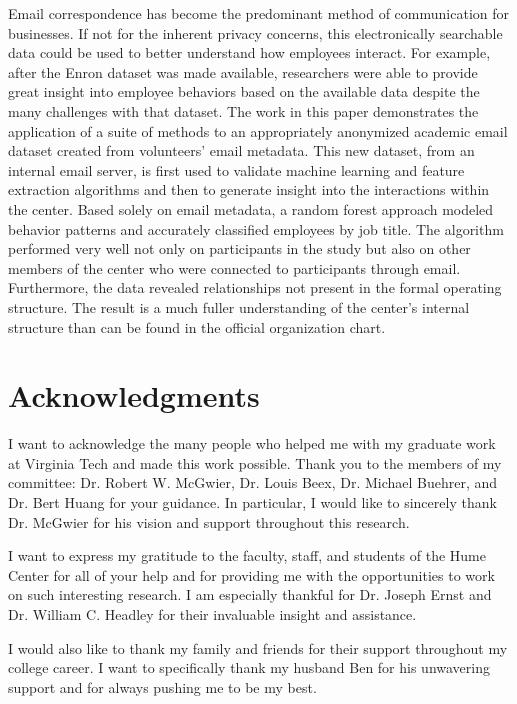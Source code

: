\documentclass[12pt]{report}
\begin{document}
Email correspondence has become the predominant method of communication for businesses.
If not for the inherent privacy concerns, this electronically searchable data could be used to better understand how employees interact. 
For example, after the Enron dataset was made available, researchers were able to provide great insight into employee behaviors based on the available data despite the many challenges with that dataset.  
The work in this paper demonstrates the application of a suite of methods to an appropriately anonymized academic email dataset created from volunteers' email metadata.  
This new dataset, from an internal email server, is first used to validate machine learning and feature extraction algorithms and then to generate insight into the interactions within the center.  
Based solely on email metadata, a random forest approach modeled behavior patterns and accurately classified employees by job title.  
The algorithm performed very well not only on participants in the study but also on other members of the center who were connected to participants through email. 
Furthermore, the data revealed relationships not present in the formal operating structure. 
The result is a much fuller understanding of the center's internal structure than can be found in the official organization chart.


\vfill



\pagebreak

\chapter*{Acknowledgments}
I want to acknowledge the many people who helped me with my graduate work at Virginia Tech and made this work possible.  Thank you to the members of my committee: Dr. Robert W. McGwier, Dr. Louis Beex, Dr. Michael Buehrer, and Dr. Bert Huang for your guidance.  In particular, I would like to sincerely thank Dr. McGwier for his vision and support throughout this research.  

I want to express my gratitude to the faculty, staff, and students of the Hume Center for all of your help and for providing me with the opportunities to work on such interesting research.  I am especially thankful for Dr. Joseph Ernst and Dr. William C. Headley for their invaluable insight and assistance.

I would also like to thank my family and friends for their support throughout my college career.  I want to specifically thank my husband Ben for his unwavering support and for always pushing me to be my best.
\end{document}
